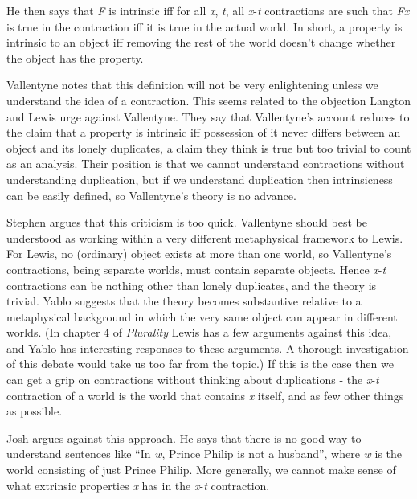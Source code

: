 He then says that \textit{F} is intrinsic iff for all \textit{x}, \textit{t}, all \textit{x}{}-\textit{t} contractions are such that \textit{Fx} is true in the contraction iff it is true in the actual world. In short, a property is intrinsic to an object iff removing the rest of the world doesn't change whether the object has the property.

Vallentyne notes that this definition will not be very enlightening unless we understand the idea of a contraction. This seems related to the objection Langton and Lewis \citeyearpar{Lewis1998Langton} urge against Vallentyne. They say that Vallentyne's account reduces to the claim that a property is intrinsic iff possession of it never differs between an object and its lonely duplicates, a claim they think is true but too trivial to count as an analysis. Their position is that we cannot understand contractions without understanding duplication, but if we understand duplication then intrinsicness can be easily defined, so Vallentyne's theory is no advance.

Stephen \citet{Yablo1999} argues that this criticism is too quick. Vallentyne should best be understood as working within a very different metaphysical framework to Lewis. For Lewis, no (ordinary) object exists at more than one world, so Vallentyne's contractions, being separate worlds, must contain separate objects. Hence \textit{x}{}-\textit{t} contractions can be nothing other than lonely duplicates, and the theory is trivial. Yablo suggests that the theory becomes substantive relative to a metaphysical background in which the very same object can appear in different worlds. (In chapter 4 of \textit{Plurality} Lewis has a few arguments against this idea, and Yablo has interesting responses to these arguments. A thorough investigation of this debate would take us too far from the topic.) If this is the case then we can get a grip on contractions without thinking about duplications - the \textit{x}{}-\textit{t} contraction of a world is the world that contains \textit{x} itself, and as few other things as possible.

Josh \citet{Parsons2007} argues against this approach. He says that there is no good way to understand sentences like ``In \textit{w}, Prince Philip is not a husband'', where \textit{w} is the world consisting of just Prince Philip. More generally, we cannot make sense of what extrinsic properties \textit{x} has in the \textit{x}{}-\textit{t} contraction. 

